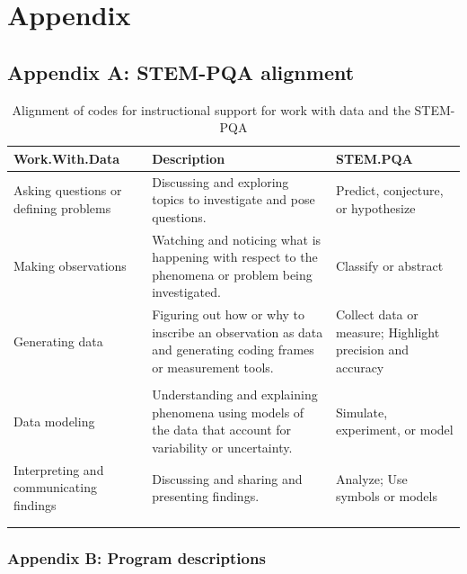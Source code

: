 \documentclass[]{msu-thesis}
\theoremstyle{definition}
\theoremstyle{definition}
\theoremstyle{definition}
\theoremstyle{remark}
\begin{document}
\chapter{Appendix}\label{appendix}

\section{Appendix A: STEM-PQA
alignment}\label{appendix-a-stem-pqa-alignment}

\begin{landscape}\begin{table}

\caption{\label{tab:unnamed-chunk-15}Alignment of codes for instructional support for work with data and the STEM-PQA}
\centering
\begin{tabular}[t]{lll}
\toprule
Work.With.Data & Description & STEM.PQA\\
\midrule
Asking questions or defining problems & Discussing and exploring topics to investigate and pose questions. & Predict, conjecture, or hypothesize\\
Making observations & Watching and noticing what is happening with respect to the phenomena or problem being investigated. & Classify or abstract\\
Generating data & Figuring out how or why to inscribe an observation as data and generating coding frames or measurement tools. & Collect data or measure; Highlight precision and accuracy\\
 &  & \\
Data modeling & Understanding and explaining phenomena using models of the data that account for variability or uncertainty. & Simulate, experiment, or model\\
Interpreting and communicating findings & Discussing and sharing and presenting findings. & Analyze; Use symbols or models\\
 &  & \\
 &  & \\
\bottomrule
\end{tabular}
\end{table}
\end{landscape}

\subsection{Appendix B: Program
descriptions}\label{appendix-b-program-descriptions}
\end{document}
